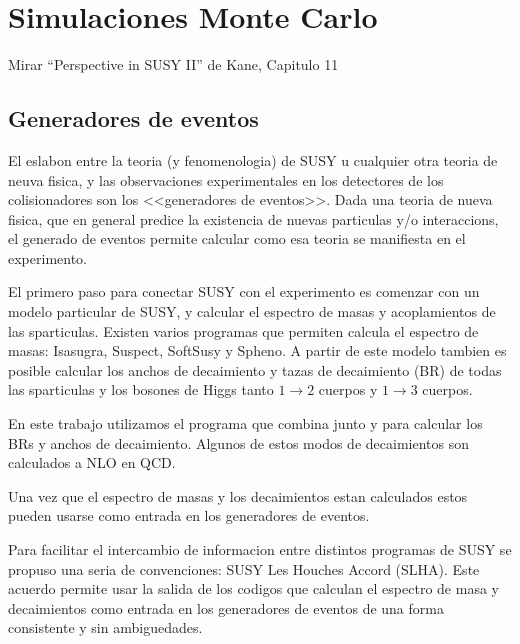 \chapter{Simulaciones Monte Carlo}


Mirar ``Perspective in SUSY II'' de Kane,
Capitulo 11

\section{Generadores de eventos}

El eslabon entre la teoria (y fenomenologia) de SUSY u cualquier
otra teoria de neuva fisica, y las observaciones experimentales
en los detectores de los colisionadores son los <<generadores
de eventos>>. Dada una teoria de nueva fisica, que en general
predice la existencia de nuevas particulas y/o interaccions,
el generado de eventos permite calcular como esa teoria se
manifiesta en el experimento.

El primero paso para conectar SUSY con el experimento es comenzar
con un modelo particular de SUSY, y calcular el espectro de masas
y acoplamientos de las sparticulas. Existen varios programas que
permiten calcula el espectro de masas: Isasugra, Suspect, SoftSusy
y Spheno.
A partir de este modelo tambien es posible calcular los anchos de
decaimiento y tazas de decaimiento (BR) de todas las sparticulas y
los bosones de Higgs tanto $1 \to 2$ cuerpos y $1 \to 3$ cuerpos.

En este trabajo utilizamos el programa {\susyhit} que
combina {\suspect} junto {\sdecay} y {\hdecay} para calcular
los BRs y anchos de decaimiento. Algunos de estos modos de
decaimientos son calculados a NLO en QCD.

Una vez que el espectro de masas y los decaimientos estan calculados
estos pueden usarse como entrada en los generadores de eventos.

Para facilitar el intercambio de informacion entre distintos programas
de SUSY se propuso una seria de convenciones: SUSY Les Houches Accord (SLHA)\cite{SLHA}.
Este acuerdo permite usar la salida de los codigos que calculan
el espectro de masa y decaimientos como entrada en los generadores de
eventos de una forma consistente y sin ambiguedades.


